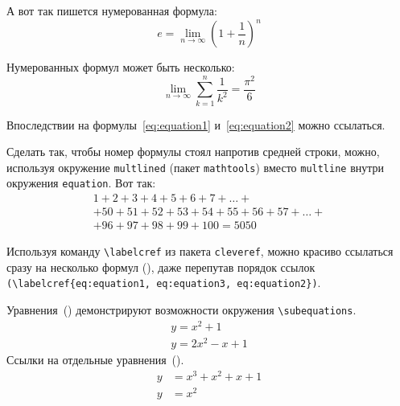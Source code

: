 А вот так пишется нумерованная формула:
\begin{equation}
  \label{eq:equation1}
  e = \lim_{n \to \infty} \left( 1+\frac{1}{n} \right) ^n
\end{equation}

Нумерованных формул может быть несколько:
\begin{equation}
  \label{eq:equation2}
  \lim_{n \to \infty} \sum_{k=1}^n \frac{1}{k^2} = \frac{\pi^2}{6}
\end{equation}

Впоследствии на формулы~\eqref{eq:equation1} и~\eqref{eq:equation2} можно ссылаться.

Сделать так, чтобы номер формулы стоял напротив средней строки, можно,
используя окружение \verb|multlined| (пакет \verb|mathtools|) вместо
\verb|multline| внутри окружения \verb|equation|. Вот так:
\begin{equation} %
  \label{eq:equation3}
    \begin{multlined}
        1+ 2+3+4+5+6+7+\dots + \\
        + 50+51+52+53+54+55+56+57 + \dots + \\
        + 96+97+98+99+100=5050
    \end{multlined}
\end{equation}

Используя команду \verb|\labelcref| из пакета \verb|cleveref|, можно
красиво ссылаться сразу на несколько формул
(), даже перепутав
порядок ссылок \verb|(\labelcref{eq:equation1, eq:equation3, eq:equation2})|.

Уравнения~() демонстрируют возможности
окружения \verb|\subequations|.
\begin{subequations}
	\label{eq:subeq_1}
	\begin{gather}
		y = x^2 + 1 \label{eq:subeq_1-1} \\
		y = 2 x^2 - x + 1 \label{eq:subeq_1-2}
	\end{gather}
\end{subequations}
Ссылки на отдельные уравнения~().
\begin{subequations}
	\label{eq:subeq_2}
	\begin{align}
		y &= x^3 + x^2 + x + 1 \label{eq:subeq_2-1} \\
		y &= x^2
	\end{align}
\end{subequations}

